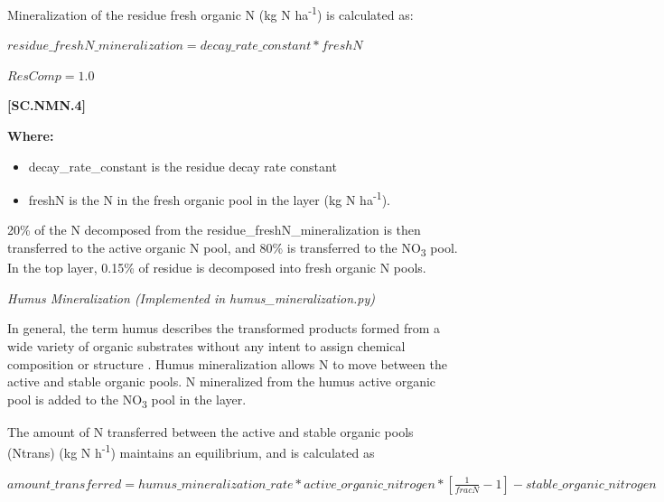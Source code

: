 Mineralization of the residue fresh organic N (kg N ha\textsuperscript{-1}) is calculated as:
\vspace{0.5cm}
            
    \begin{center}
\(residue\_freshN\_mineralization=decay\_rate\_constant * freshN	\)
\vspace{0.1cm}

\(ResComp = 1.0\)

    \end{center}
        \vspace{0.5cm} 
    
            {\raggedleft \textbf{[SC.NMN.4]}\par}
            \vspace{0.5cm}

        \textbf{Where:}
            
        \begin{itemize}
            \item decay\_rate\_constant is the residue decay rate constant
            \item freshN is the N in the fresh organic pool in the layer (kg N ha\textsuperscript{-1}).
        \end{itemize}
        \vspace{0.5cm}
20\% of the N decomposed from the residue\_freshN\_mineralization is then transferred to the active organic N pool, and 80\% is transferred to the NO\textsubscript{3}  pool. In the top layer, 0.15\% of residue is decomposed into fresh organic N pools.

\textit{Humus Mineralization (Implemented in humus\_mineralization.py)}
\vspace{0.2cm}

In general, the term humus describes the transformed products formed from a wide variety of organic substrates without any intent to assign chemical composition or structure \parencite{hayes2020vindication}. Humus mineralization allows N to move between the active and stable organic pools.  N mineralized from the humus active organic pool is added to the NO\textsubscript{3} pool in the layer. 
\vspace{0.2cm}

The amount of N transferred between the active and stable organic pools (Ntrans) (kg N h\textsuperscript{-1}) maintains an equilibrium, and is calculated as
\vspace{0.5cm}
            
    \begin{center}
\(amount\_transferred=humus\_mineralization\_rate* active\_organic\_nitrogen  *[\frac{1}{fracN}-1]-stable\_organic\_nitrogen \)

    \end{center}
        \vspace{0.5cm} 
    
